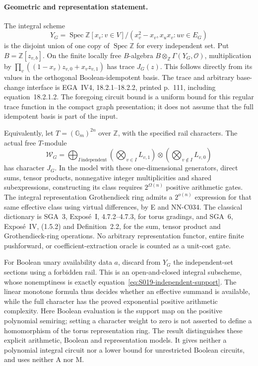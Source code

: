 \paragraph{Geometric and representation statement.}
The integral scheme
\[
 Y_G=\operatorname{Spec}
 \mathbb Z[x_v:v\in V]/
           (x_v^2-x_v, x_ux_v:uv\in E_G)
\]
is the disjoint union of one copy of $\operatorname{Spec}\mathbb Z$
for every independent set.  Put $B=\mathbb Z[z_{v,b}]$.
On the finite locally free $B$-algebra
$B\otimes_{\mathbb Z}\Gamma(Y_G,\mathcal O)$, multiplication
by $\prod_v((1-x_v)z_{v,0}+x_vz_{v,1})$ has trace $J_G(z)$.
This follows directly from its values in the orthogonal
Boolean-idempotent basis.  The trace and arbitrary base-change
interface is EGA~IV4, 18.2.1--18.2.2, printed p.~111, including
equation~18.2.1.2.  The foregoing circuit bound is a uniform
bound for this regular trace function in the compact graph
presentation; it does not assume that the full idempotent
basis is part of the input.

Equivalently, let $T=(\mathbb G_m)^{2n}$ over $\mathbb Z$,
with the specified rail characters.  The actual free
$T$-module
\[
 \mathcal W_G=
 \bigoplus_{I\,\text{independent}}
       \left(\bigotimes_{v\in I}L_{v,1}\right)
          \otimes
       \left(\bigotimes_{v\notin I}L_{v,0}\right)
\]
has character $J_G$.  In the model with these one-dimensional
generators, direct sums, tensor products, nonnegative integer
multiplicities and shared subexpressions, constructing its
class requires $2^{\Omega(n)}$ positive arithmetic gates.
The integral representation Grothendieck ring admits a
$2^{o(n)}$ expression for that same effective class using
virtual differences, by E and NN-C034.  The classical
dictionary is SGA~3, Expos\'e~I, 4.7.2--4.7.3, for torus
gradings, and SGA~6, Expos\'e~IV, (1.5.2) and Definition~2.2,
for the sum, tensor product and Grothendieck-ring operations.
No arbitrary representation functor, entire finite pushforward,
or coefficient-extraction oracle is counted as a unit-cost gate.

For Boolean unary availability data $a$, discard from $Y_G$
the independent-set sections using a forbidden rail.
This is an open-and-closed integral subscheme, whose nonemptiness
is exactly equation~\eqref{eq:S019-independent-support}.
The linear monotone formula thus decides whether an effective
summand is available, while the full character has the proved
exponential positive arithmetic complexity.  Here Boolean
evaluation is the support map on the positive polynomial
semiring; setting a character weight to zero is not asserted
to define a homomorphism of the torus representation ring.
The result distinguishes these explicit arithmetic, Boolean
and representation models.  It gives neither a polynomial
integral circuit nor a lower bound for unrestricted Boolean
circuits, and uses neither A nor M.
